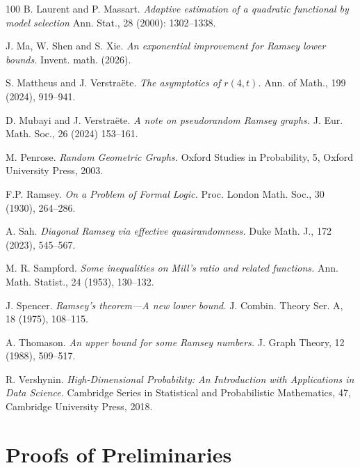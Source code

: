 \documentclass[11pt]{amsart}
\theoremstyle{definition}
\begin{document}
\begin{thebibliography}{100}
B. Laurent and P. Massart.
\textit{Adaptive estimation of a quadratic functional by model selection} 
Ann. Stat., 28 (2000): 1302--1338.

J. Ma, W. Shen and S. Xie.
\textit{An exponential improvement for Ramsey lower bounds.}
Invent. math. (2026). 

S. Mattheus and J. Verstra\"{e}te.
\textit{The asymptotics of $r(4, t)$.}
Ann. of Math., 199 (2024), 919--941.

D. Mubayi and J. Verstra\"{e}te.
\textit{A note on pseudorandom Ramsey graphs.}
J. Eur. Math. Soc., 26 (2024) 153--161.

M. Penrose.
\textit{Random Geometric Graphs.}
Oxford Studies in Probability, 5, Oxford University Press, 2003.

F.P. Ramsey.
\textit{On a Problem of Formal Logic.}
Proc. London Math. Soc., 30 (1930), 264–286.

A. Sah.
\textit{Diagonal Ramsey via effective quasirandomness.}
Duke Math. J., 172 (2023), 545–567.

M. R. Sampford.
\textit{Some inequalities on Mill's ratio and related functions.}
Ann. Math. Statist., 24 (1953), 130--132.

J. Spencer.
\textit{Ramsey's theorem---A new lower bound.}
J. Combin. Theory Ser. A, 18 (1975), 108–115.

A. Thomason.
\textit{An upper bound for some Ramsey numbers.}
J. Graph Theory, 12 (1988), 509–517.

R. Vershynin.
\textit{High-Dimensional Probability: An Introduction with Applications in Data Science.}
Cambridge Series in Statistical and Probabilistic Mathematics, 47, Cambridge University Press, 2018.

\end{thebibliography}

\appendix

\section{Proofs of Preliminaries}\label{sec:appendix_1}
\end{document}
